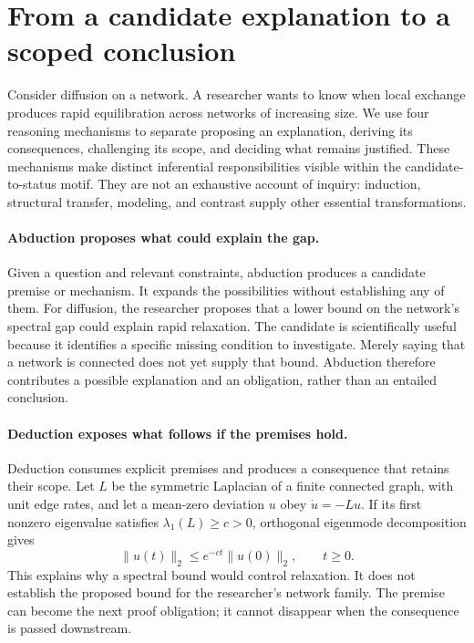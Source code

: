 %
%
%
\section{From a candidate explanation to a scoped conclusion}
Consider diffusion on a network. A researcher wants to know when local exchange produces rapid equilibration across networks of increasing size. We use four reasoning mechanisms to separate proposing an explanation, deriving its consequences, challenging its scope, and deciding what remains justified. These mechanisms make distinct inferential responsibilities visible within the candidate-to-status motif. They are not an exhaustive account of inquiry: induction, structural transfer, modeling, and contrast supply other essential transformations.

\paragraph{Abduction proposes what could explain the gap.}
Given a question and relevant constraints, abduction produces a candidate premise or mechanism. It expands the possibilities without establishing any of them. For diffusion, the researcher proposes that a lower bound on the network's spectral gap could explain rapid relaxation. The candidate is scientifically useful because it identifies a specific missing condition to investigate. Merely saying that a network is connected does not yet supply that bound. Abduction therefore contributes a possible explanation and an obligation, rather than an entailed conclusion.

\paragraph{Deduction exposes what follows if the premises hold.}
Deduction consumes explicit premises and produces a consequence that retains their scope. Let $L$ be the symmetric Laplacian of a finite connected graph, with unit edge rates, and let a mean-zero deviation $u$ obey $\dot u=-Lu$. If its first nonzero eigenvalue satisfies $\lambda_1(L)\geq c>0$, orthogonal eigenmode decomposition gives
\[
  \|u(t)\|_2\leq e^{-ct}\|u(0)\|_2,\qquad t\geq0.
\]
This explains why a spectral bound would control relaxation. It does not establish the proposed bound for the researcher's network family. The premise can become the next proof obligation; it cannot disappear when the consequence is passed downstream.

